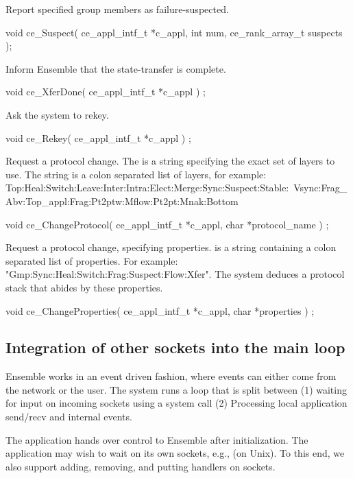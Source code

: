  Report specified group members as failure-suspected.
\begin{codebox}
void ce_Suspect(
    ce_appl_intf_t *c_appl,
    int num,
    ce_rank_array_t suspects
);
\end{codebox}
	
Inform Ensemble that the state-transfer is complete. 
\begin{codebox}
void ce_XferDone(
    ce_appl_intf_t *c_appl
) ;
\end{codebox}

Ask the system to rekey.
\begin{codebox}
void ce_Rekey(
    ce_appl_intf_t *c_appl
) ;
\end{codebox}


Request a protocol change.  The  is a string
specifying the exact set of layers to use. The string is a colon
separated list of layers, for example:
Top:Heal:Switch:Leave:Inter:Intra:Elect:Merge:Sync:Suspect:Stable:\
Vsync:Frag\_Abv:Top\_appl:Frag:Pt2ptw:Mflow:Pt2pt:Mnak:Bottom
\begin{codebox}
void ce_ChangeProtocol(
    ce_appl_intf_t *c_appl,
    char *protocol_name
) ;
\end{codebox}


Request a protocol change, specifying properties.
 is a string containing a colon separated list of
properties. For example:
"Gmp:Sync:Heal:Switch:Frag:Suspect:Flow:Xfer".
The system deduces a protocol stack that abides by these properties.
\begin{codebox}
void ce_ChangeProperties(
    ce_appl_intf_t *c_appl,
    char *properties
) ;
\end{codebox}


\subsection{Integration of other sockets into the main loop}
Ensemble works in an event driven fashion, where events can either
come from the network or the user. The system runs a loop that is
split between (1) waiting for input on incoming sockets using a
 system call (2) Processing local
application send/recv and internal events. 

The application hands over control to Ensemble after initialization.
The application may wish to wait on its own sockets, e.g.,  (on
Unix). To this end, we also support adding, removing, and putting
handlers on sockets.

